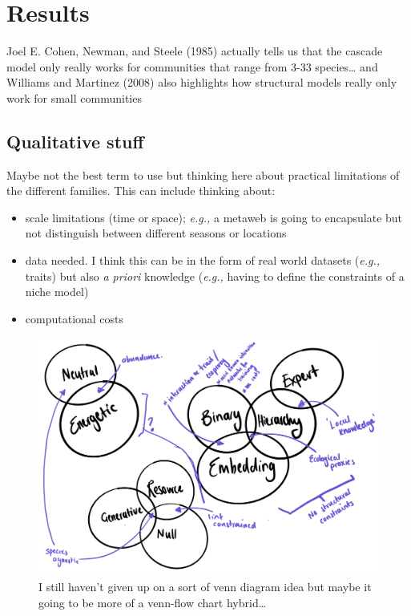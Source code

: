 \documentclass[
  letterpaper,
  DIV=11,
  numbers=noendperiod]{scrartcl}
\providecommand{\tightlist}{%
  \setlength{\itemsep}{0pt}\setlength{\parskip}{0pt}}\usepackage{longtable,booktabs,array}
\begin{document}
\section{Results}\label{results}

Joel E. Cohen, Newman, and Steele (1985) actually tells us that the
cascade model only really works for communities that range from 3-33
species\ldots{} and Williams and Martinez (2008) also highlights how
structural models really only work for small communities

\subsection{Qualitative stuff}\label{qualitative-stuff}

Maybe not the best term to use but thinking here about practical
limitations of the different families. This can include thinking about:

\begin{itemize}
\tightlist
\item
  scale limitations (time or space); \emph{e.g.,} a metaweb is going to
  encapsulate but not distinguish between different seasons or locations
\item
  data needed. I think this can be in the form of real world datasets
  (\emph{e.g.,} traits) but also \emph{a priori} knowledge (\emph{e.g.,}
  having to define the constraints of a niche model)
\item
  computational costs
\end{itemize}

\begin{figure}[H]

{\centering \includegraphics{images/model_venn.png}

}

\caption{I still haven't given up on a sort of venn diagram idea but
maybe it going to be more of a venn-flow chart hybrid\ldots{}}

\end{figure}%
\end{document}
